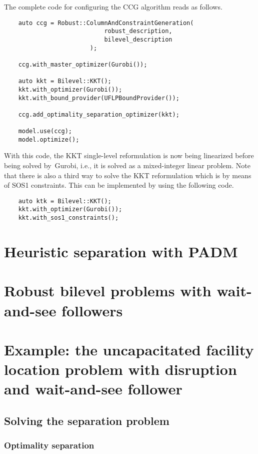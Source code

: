 The complete code for configuring the CCG algorithm reads as follows.
\begin{lstlisting}
    auto ccg = Robust::ColumnAndConstraintGeneration(
                            robust_description,
                            bilevel_description
                        );
    
    ccg.with_master_optimizer(Gurobi());

    auto kkt = Bilevel::KKT();
    kkt.with_optimizer(Gurobi());
    kkt.with_bound_provider(UFLPBoundProvider());

    ccg.add_optimality_separation_optimizer(kkt);

    model.use(ccg);
    model.optimize();
\end{lstlisting}

With this code, the KKT single-level reformulation is now being linearized
before being solved by~\textsf{Gurobi}, i.e., it is solved as a mixed-integer
linear problem. Note that there is also a third way to solve the KKT
reformulation which is by means of SOS1 constraints. This can be implemented
by using the following code.
%
\begin{lstlisting}
    auto ktk = Bilevel::KKT();
    kkt.with_optimizer(Gurobi());
    kkt.with_sos1_constraints();   
\end{lstlisting}

\section{Heuristic separation with PADM}


\section{Robust bilevel problems with wait-and-see followers}

\section[Example: the bilevel UFLP with disruption]{Example: the uncapacitated facility location problem with disruption and wait-and-see follower}

\subsection{Solving the separation problem}

\subsubsection{Optimality separation}
